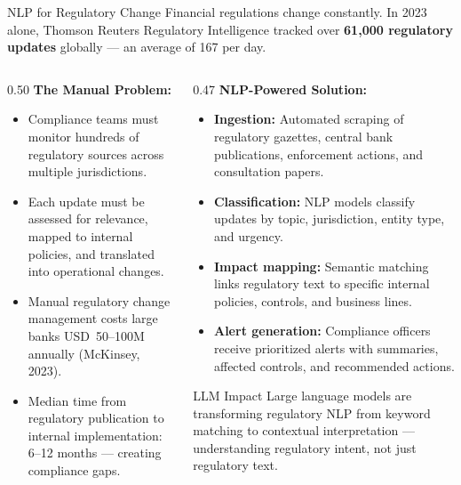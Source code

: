 \begin{frame}{NLP for Regulatory Change}
  Financial regulations change constantly. In 2023 alone, Thomson Reuters
  Regulatory Intelligence tracked over \textbf{61,000 regulatory updates}
  globally --- an average of 167 per day.

  \vspace{0.5em}
  \begin{columns}[T]
    \begin{column}{0.50\textwidth}
      \textcolor{mlpurple}{\textbf{The Manual Problem:}}
      \begin{itemize}
        \item Compliance teams must monitor hundreds of regulatory sources
              across multiple jurisdictions.
        \item Each update must be assessed for relevance, mapped to internal
              policies, and translated into operational changes.
        \item Manual regulatory change management costs large banks
              USD~50--100M annually (McKinsey, 2023).
        \item Median time from regulatory publication to internal
              implementation: 6--12 months --- creating compliance gaps.
      \end{itemize}
    \end{column}
    \begin{column}{0.47\textwidth}
      \textcolor{mlpurple}{\textbf{NLP-Powered Solution:}}
      \begin{itemize}
        \item \textbf{Ingestion:} Automated scraping of regulatory gazettes,
              central bank publications, enforcement actions, and
              consultation papers.
        \item \textbf{Classification:} NLP models classify updates by topic,
              jurisdiction, entity type, and urgency.
        \item \textbf{Impact mapping:} Semantic matching links regulatory
              text to specific internal policies, controls, and business
              lines.
        \item \textbf{Alert generation:} Compliance officers receive
              prioritized alerts with summaries, affected controls, and
              recommended actions.
      \end{itemize}

      \vspace{0.3em}
      \begin{block}{LLM Impact}
        Large language models are transforming regulatory NLP from keyword
        matching to \textcolor{mlpurple}{contextual interpretation} ---
        understanding regulatory intent, not just regulatory text.
      \end{block}
    \end{column}
  \end{columns}
\end{frame}

